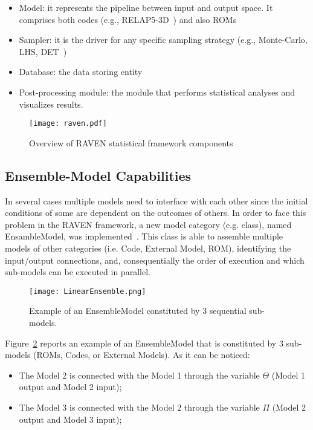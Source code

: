 \begin{itemize}
  \item Model: it represents the pipeline between input and output space. It comprises both codes 
        (e.g., RELAP5-3D~\cite{relap5}) and also ROMs 
  \item Sampler: it is the driver for any specific sampling strategy (e.g., Monte-Carlo, LHS, 
        DET~\cite{ANS2014_adaptDET,PSA2013_Raven})
  \item Database: the data storing entity
  \item Post-processing module: the module that performs statistical analyses and visualizes results.
\end{itemize}

\begin{figure}
    \centering
    \centerline{\texttt{[image: raven.pdf]}} 
    \caption{Overview of RAVEN statistical framework components}
    \label{fig:ravenScheme}
\end{figure}

\subsection{Ensemble-Model Capabilities}

In several cases multiple models need to interface with each other since the initial conditions of some are 
dependent on the outcomes of others. In order to face this problem in the RAVEN framework, a new model category
(e.g. class), named EnsambleModel, was implemented~\cite{alfonsiEnsemble}. This class is able to assemble multiple models of 
other categories (i.e. Code, External Model, ROM), identifying the input/output connections, and, consequentially 
the order of execution and which sub-models can be executed in parallel. 
 
 \begin{figure}
    \centering
    \centerline{\texttt{[image: LinearEnsemble.png]}} 
    \caption{Example of an EnsembleModel constituted by 3 sequential sub-models.}
    \label{fig:exampleEnsembleModel}
\end{figure}
 
Figure~\ref{fig:exampleEnsembleModel} reports an example of an EnsembleModel that is constituted by 
3 sub-models (ROMs, Codes, or External Models). As it can be noticed:

\begin{itemize}
  \item The Model 2 is connected with the Model 1 through the variable $\Theta$ (Model 1 output and Model 2 input);
  \item The Model 3 is connected with the Model 2 through the variable $\Pi$ (Model 2 output and Model 3 input);
\end{itemize}

